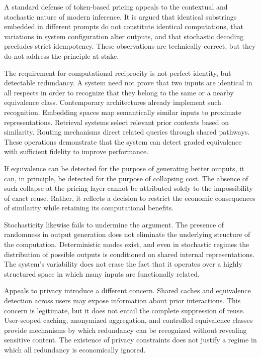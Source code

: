 \documentclass[12pt, oneside]{article}
\begin{document}
A standard defense of token-based pricing appeals to the contextual and stochastic nature of modern inference. It is argued that identical substrings embedded in different prompts do not constitute identical computations, that variations in system configuration alter outputs, and that stochastic decoding precludes strict idempotency. These observations are technically correct, but they do not address the principle at stake.

The requirement for computational reciprocity is not perfect identity, but detectable redundancy. A system need not prove that two inputs are identical in all respects in order to recognize that they belong to the same or a nearby equivalence class. Contemporary architectures already implement such recognition. Embedding spaces map semantically similar inputs to proximate representations. Retrieval systems select relevant prior contexts based on similarity. Routing mechanisms direct related queries through shared pathways. These operations demonstrate that the system can detect graded equivalence with sufficient fidelity to improve performance.

If equivalence can be detected for the purpose of generating better outputs, it can, in principle, be detected for the purpose of collapsing cost. The absence of such collapse at the pricing layer cannot be attributed solely to the impossibility of exact reuse. Rather, it reflects a decision to restrict the economic consequences of similarity while retaining its computational benefits.

Stochasticity likewise fails to undermine the argument. The presence of randomness in output generation does not eliminate the underlying structure of the computation. Deterministic modes exist, and even in stochastic regimes the distribution of possible outputs is conditioned on shared internal representations. The system’s variability does not erase the fact that it operates over a highly structured space in which many inputs are functionally related.

Appeals to privacy introduce a different concern. Shared caches and equivalence detection across users may expose information about prior interactions. This concern is legitimate, but it does not entail the complete suppression of reuse. User-scoped caching, anonymized aggregation, and controlled equivalence classes provide mechanisms by which redundancy can be recognized without revealing sensitive content. The existence of privacy constraints does not justify a regime in which all redundancy is economically ignored.
\end{document}
